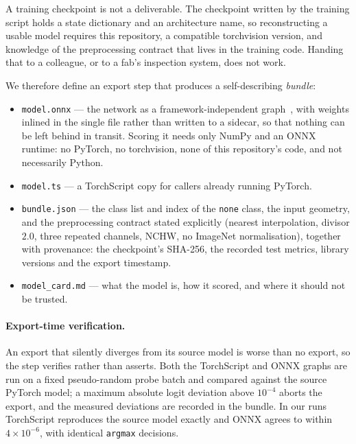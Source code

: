 \documentclass[11pt,a4paper]{article}
\begin{document}
A training checkpoint is not a deliverable. The checkpoint written by the
training script holds a state dictionary and an architecture name, so
reconstructing a usable model requires this repository, a compatible
torchvision version, and knowledge of the preprocessing contract that lives in
the training code. Handing that to a colleague, or to a fab's inspection
system, does not work.

We therefore define an export step that produces a self-describing
\emph{bundle}:

\begin{itemize}
  \item \texttt{model.onnx} --- the network as a framework-independent
    graph~\citep{onnx}, with weights inlined in the single file rather than
    written to a sidecar, so that nothing can be left behind in transit.
    Scoring it needs only NumPy and an ONNX runtime: no PyTorch, no
    torchvision, none of this repository's code, and not necessarily Python.
  \item \texttt{model.ts} --- a TorchScript copy for callers already running
    PyTorch.
  \item \texttt{bundle.json} --- the class list and index of the
    \texttt{none} class, the input geometry, and the preprocessing contract
    stated explicitly (nearest interpolation, divisor $2.0$, three repeated
    channels, NCHW, no ImageNet normalisation), together with provenance: the
    checkpoint's SHA-256, the recorded test metrics, library versions and the
    export timestamp.
  \item \texttt{model\_card.md} --- what the model is, how it scored, and
    where it should not be trusted.
\end{itemize}

\paragraph{Export-time verification.}
An export that silently diverges from its source model is worse than no export,
so the step verifies rather than asserts. Both the TorchScript and ONNX graphs
are run on a fixed pseudo-random probe batch and compared against the source
PyTorch model; a maximum absolute logit deviation above $10^{-4}$ aborts the
export, and the measured deviations are recorded in the bundle. In our runs
TorchScript reproduces the source model exactly and ONNX agrees to within
$4\times10^{-6}$, with identical \texttt{argmax} decisions.
\end{document}
